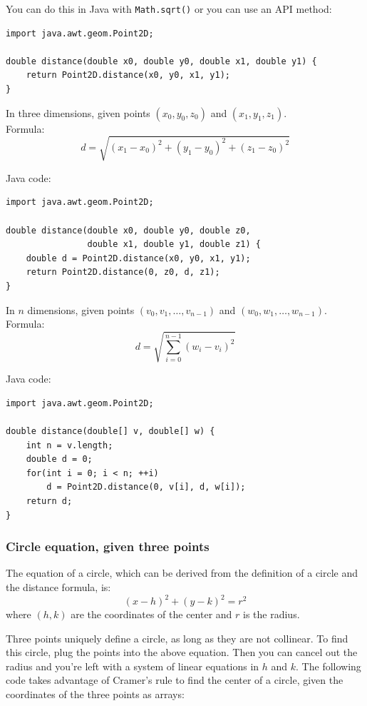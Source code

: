 \documentclass[a4paper,12pt]{article}
\begin{document}
\noindent You can do this in Java with \verb/Math.sqrt()/ or you can use an API method:
\begin{lstlisting}
import java.awt.geom.Point2D;

double distance(double x0, double y0, double x1, double y1) {
	return Point2D.distance(x0, y0, x1, y1);
}
\end{lstlisting}

\noindent In three dimensions, given points $(x_0, y_0, z_0)$ and $(x_1, y_1, z_1)$. \\ Formula:
\[ d = \sqrt{(x_1 - x_0)^2 + (y_1 - y_0)^2 + (z_1 - z_0)^2} \]

\noindent Java code:
\begin{lstlisting}
import java.awt.geom.Point2D;

double distance(double x0, double y0, double z0,
                double x1, double y1, double z1) {
	double d = Point2D.distance(x0, y0, x1, y1);
	return Point2D.distance(0, z0, d, z1);
}
\end{lstlisting}

\noindent In $n$ dimensions, given points $(v_0, v_1, \ldots, v_{n-1})$ and $(w_0, w_1, \ldots, w_{n-1})$. \\ Formula:
\[ d = \sqrt{\sum_{i=0}^{n-1}{(w_i - v_i)^2}} \]

\noindent Java code:
\begin{lstlisting}
import java.awt.geom.Point2D;

double distance(double[] v, double[] w) {
	int n = v.length;
	double d = 0;
	for(int i = 0; i < n; ++i)
		d = Point2D.distance(0, v[i], d, w[i]);
	return d;
}
\end{lstlisting}

\subsubsection{Circle equation, given three points}
\noindent The equation of a circle, which can be derived from the definition of a circle and the distance formula, is:
\[(x-h)^2+(y-k)^2=r^2\]
\noindent where $(h,k)$ are the coordinates of the center and $r$ is the radius.

Three points uniquely define a circle, as long as they are not collinear. To find this circle, plug the points into the above equation. Then you can cancel out the radius and you're left with a system of linear equations in $h$ and $k$. The following code takes advantage of Cramer's rule to find the center of a circle, given the coordinates of the three points as arrays:
\end{document}
